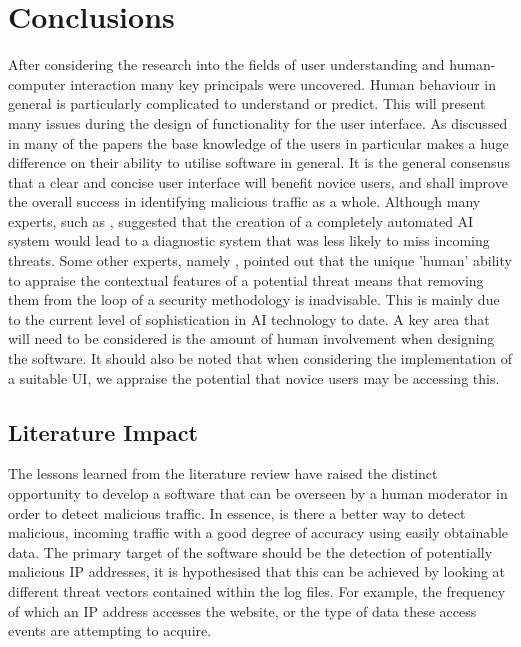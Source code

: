 \section{Conclusions} 
 
 After considering the research into the fields of user understanding and human-computer interaction many key principals were uncovered. Human behaviour in general is particularly complicated to understand or predict. This will present many issues during the design of functionality for the user interface. As discussed in many of the papers the base knowledge of the users in particular makes a huge difference on their ability to utilise software in general. It is the general consensus that a clear and concise user interface will benefit novice users, and shall improve the overall success in identifying malicious traffic as a whole. Although many experts, such as \citeauthor{cranor2008framework}, suggested that the creation of a completely automated AI system would lead to a diagnostic system that was less likely to miss incoming threats. Some other experts, namely \citeauthor{TargetedCyberSecurity}, pointed out that the unique 'human' ability to appraise the contextual features of a potential threat means that removing them from the loop of a security methodology is inadvisable. This is mainly due to the current level of sophistication in AI technology to date. A key area that will need to be considered is the amount of human involvement when designing the software. It should also be noted that when considering the implementation of a suitable UI, we appraise the potential that novice users may be accessing this.
 
\subsection{Literature Impact}
 
 The lessons learned from the literature review have raised the distinct opportunity to develop a software that can be overseen by a human moderator in order to detect malicious traffic. In essence, is there a better way to detect malicious, incoming traffic with a good degree of accuracy using easily obtainable data. The primary target of the software should be the detection of potentially malicious IP addresses, it is hypothesised that this can be achieved by looking at different threat vectors contained within the log files. For example, the frequency of which an IP address accesses the website, or the type of data these access events are attempting to acquire.